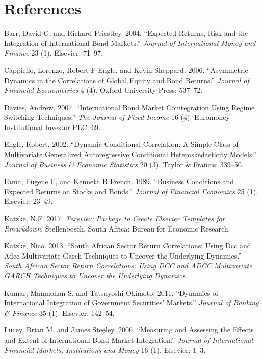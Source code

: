 \documentclass[11pt,preprint, authoryear]{elsarticle}
\numberwithin{equation}{section}
\numberwithin{figure}{section}
\numberwithin{table}{section}
\begin{document}
\section*{\texorpdfstring{References
\label{references}}{References }}\label{references}

\hypertarget{refs}{}
\hypertarget{ref-barr2004}{}
Barr, David G, and Richard Priestley. 2004. ``Expected Returns, Risk and
the Integration of International Bond Markets.'' \emph{Journal of
International Money and Finance} 23 (1). Elsevier: 71--97.

\hypertarget{ref-cappiello2006}{}
Cappiello, Lorenzo, Robert F Engle, and Kevin Sheppard. 2006.
``Asymmetric Dynamics in the Correlations of Global Equity and Bond
Returns.'' \emph{Journal of Financial Econometrics} 4 (4). Oxford
University Press: 537--72.

\hypertarget{ref-davies2007}{}
Davies, Andrew. 2007. ``International Bond Market Cointegration Using
Regime Switching Techniques.'' \emph{The Journal of Fixed Income} 16
(4). Euromoney Institutional Investor PLC: 69.

\hypertarget{ref-engle2002dynamic}{}
Engle, Robert. 2002. ``Dynamic Conditional Correlation: A Simple Class
of Multivariate Generalized Autoregressive Conditional
Heteroskedasticity Models.'' \emph{Journal of Business \& Economic
Statistics} 20 (3). Taylor \& Francis: 339--50.

\hypertarget{ref-FRENCH}{}
Fama, Eugene F, and Kenneth R French. 1989. ``Business Conditions and
Expected Returns on Stocks and Bonds.'' \emph{Journal of Financial
Economics} 25 (1). Elsevier: 23--49.

\hypertarget{ref-Texevier}{}
Katzke, N.F. 2017. \emph{Texevier: Package to Create Elsevier Templates
for Rmarkdown}. Stellenbosch, South Africa: Bureau for Economic
Research.

\hypertarget{ref-katzke2013}{}
Katzke, Nico. 2013. ``South African Sector Return Correlations: Using
Dcc and Adcc Multivariate Garch Techniques to Uncover the Underlying
Dynamics.'' \emph{South African Sector Return Correlations: Using DCC
and ADCC Multivariate GARCH Techniques to Uncover the Underlying
Dynamics}.

\hypertarget{ref-kumar2011}{}
Kumar, Manmohan S, and Tatsuyoshi Okimoto. 2011. ``Dynamics of
International Integration of Government Securities' Markets.''
\emph{Journal of Banking \& Finance} 35 (1). Elsevier: 142--54.

\hypertarget{ref-lucey2006}{}
Lucey, Brian M, and James Steeley. 2006. ``Measuring and Assessing the
Effects and Extent of International Bond Market Integration.''
\emph{Journal of International Financial Markets, Institutions and
Money} 16 (1). Elsevier: 1--3.




\end{document}
